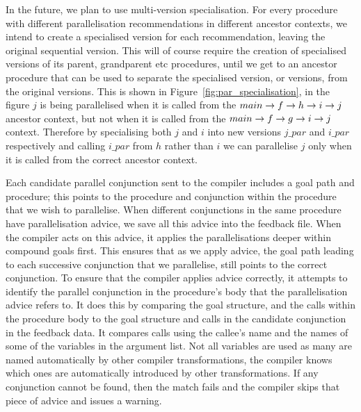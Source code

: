 In the future, we plan to use multi-version specialisation.
For every procedure with different parallelisation recommendations
in different ancestor contexts,
we intend to create a specialised version for each recommendation,
leaving the original sequential version.
This will of course require the creation of specialised versions
of its parent, grandparent etc procedures,
until we get to an ancestor procedure that can be used to separate the
specialised version, or versions, from the original versions.
This is shown in Figure~\ref{fig:par_specialisation}, in the figure $j$ is
being parallelised when it is called from the
$main \rightarrow f \rightarrow h \rightarrow i \rightarrow j$ ancestor context,
but not when it is called from the $main \rightarrow f \rightarrow g \rightarrow i \rightarrow j$
context.
Therefore by specialising both $j$ and $i$ into new versions 
$j\_par$ and $i\_par$ respectively and calling $i\_par$ from $h$ rather than
$i$ we can parallelise $j$ only when it is called from the correct ancestor
context.

Each candidate parallel conjunction sent to the compiler includes a goal
path and procedure;
this points to the procedure and conjunction within the procedure that we
wish to parallelise.
When different conjunctions in the same procedure have parallelisation
advice, we save all this advice into the feedback file.
When the compiler acts on this advice,
it applies the parallelisations deeper within compound goals first.
This ensures that as we apply advice,
the goal path leading to each
successive conjunction that we parallelise, still points to the correct
conjunction.
To ensure that the compiler applies advice correctly,
it attempts to identify the parallel conjunction in the procedure's body
that the parallelisation advice refers to.
It does this by comparing the goal structure, and the calls within the
procedure body to
the goal structure and calls in the candidate conjunction in the feedback
data.
It compares calls using the callee's name and the names of some of the
variables in the argument list.
Not all variables are used as many are named automatically by other compiler
transformations,
the compiler knows which ones are automatically introduced by other
transformations.
If any conjunction cannot be found,
then the match fails and the compiler skips that piece of advice and issues
a warning.

